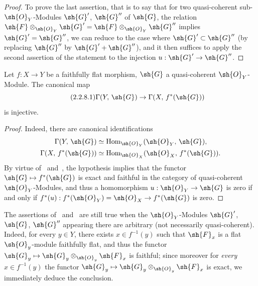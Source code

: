 \begin{proof}
To prove the last assertion, that is to say that for two quasi-coherent sub-$\sh{O}_Y$-Modules $\sh{G}'$, $\sh{G}''$ of $\sh{G}$, the relation $\sh{F}\otimes_{\sh{O}_Y}\sh{G}'=\sh{F}\otimes_{\sh{O}_Y}\sh{G}''$ implies $\sh{G}'=\sh{G}''$, we can reduce to the case where $\sh{G}'\subset\sh{G}''$ (by replacing $\sh{G}''$ by $\sh{G}'+\sh{G}''$), and it then suffices to apply the second assertion of the statement to the injection $u:\sh{G}'\to\sh{G}''$.
\end{proof}

\begin{corollary}[2.2.8]
\label{IV.2.2.8}
Let $f:X\to Y$ be a faithfully flat morphism, $\sh{G}$ a quasi-coherent $\sh{O}_Y$-Module.
The canonical map
\begin{equation}
\tag{2.2.8.1}
\label{IV.2.2.8.1}
  \Gamma(Y,\,\sh{G}) \to \Gamma(X,\,f^*(\sh{G}))
\end{equation}
is injective.
\end{corollary}

\begin{proof}
Indeed, there are canonical identifications~
\begin{align*}
  \Gamma(Y,\,\sh{G})
    &\simeq \operatorname{Hom}_{\sh{O}_Y}(\sh{O}_Y,\,\sh{G}),\\
  \Gamma(X,\,f^*(\sh{G}))
    &\simeq \operatorname{Hom}_{\sh{O}_X}(\sh{O}_X,\,f^*(\sh{G})).
\end{align*}
By virtue of~ and~, the hypothesis implies that the functor $\sh{G}\mapsto f^*(\sh{G})$ is exact and faithful in the category of quasi-coherent $\sh{O}_Y$-Modules, and thus a homomorphism $u:\sh{O}_Y\to\sh{G}$ is zero if and only if $f^*(u):f^*(\sh{O}_Y)=\sh{O}_X\to f^*(\sh{G})$ is zero.
\end{proof}

\begin{remark}[2.2.9]
\label{IV.2.2.9}
The assertions of~ and~ are still true when the $\sh{O}_Y$-Modules $\sh{G}'$, $\sh{G}$, $\sh{G}''$ appearing there are arbitrary (not necessarily quasi-coherent).
Indeed, for every $y\in Y$, there exists $x\in f^{-1}(y)$ such that $\sh{F}_x$ is a flat $\sh{O}_y$-module
faithfully flat, and thus the functor $\sh{G}_y\mapsto\sh{G}_y\otimes_{\sh{O}_y}\sh{F}_x$ is faithful; since moreover for \emph{every} $x\in f^{-1}(y)$ the functor $\sh{G}_y\mapsto\sh{G}_y\otimes_{\sh{O}_y}\sh{F}_x$ is exact, we immediately deduce the conclusion.
\end{remark}


